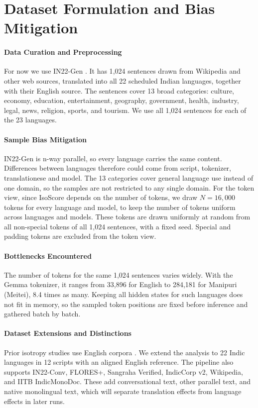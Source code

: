 \section{Dataset Formulation and Bias Mitigation}
\label{sec:app1_datasets}

\paragraph{Data Curation and Preprocessing}
For now we use IN22-Gen \citep{gala-etal-2023-indictrans2}. It has 1{,}024 sentences drawn from Wikipedia and other web sources, translated into all 22 scheduled Indian languages, together with their English source. The sentences cover 13 broad categories: culture, economy, education, entertainment, geography, government, health, industry, legal, news, religion, sports, and tourism. We use all 1{,}024 sentences for each of the 23 languages.

\paragraph{Sample Bias Mitigation}
IN22-Gen is n-way parallel, so every language carries the same content. Differences between languages therefore could come from script, tokenizer, translationese and model. The 13 categories cover general language use instead of one domain, so the samples are not restricted to any single domain. For the token view, since IsoScore depends on the number of tokens, we draw $N = 16{,}000$ tokens for every language and model, to keep the number of tokens uniform across languages and models. These tokens are drawn uniformly at random from all non-special tokens of all 1{,}024 sentences, with a fixed seed. Special and padding tokens are excluded from the token view.

\paragraph{Bottlenecks Encountered}
The number of tokens for the same 1{,}024 sentences varies widely. With the Gemma tokenizer, it ranges from 33{,}896 for English to 284{,}181 for Manipuri (Meitei), 8.4 times as many. Keeping all hidden states for such languages does not fit in memory, so the sampled token positions are fixed before inference and gathered batch by batch. 

\paragraph{Dataset Extensions and Distinctions}
Prior isotropy studies use English corpora \citep{ethayarajh-2019-contextual,rudman-etal-2022-isoscore}. We extend the analysis to 22 Indic languages in 12 scripts with an aligned English reference. The pipeline also supports IN22-Conv, FLORES+, Sangraha Verified, IndicCorp v2, Wikipedia, and IITB IndicMonoDoc. These add conversational text, other parallel text, and native monolingual text, which will separate translation effects from language effects in later runs.

